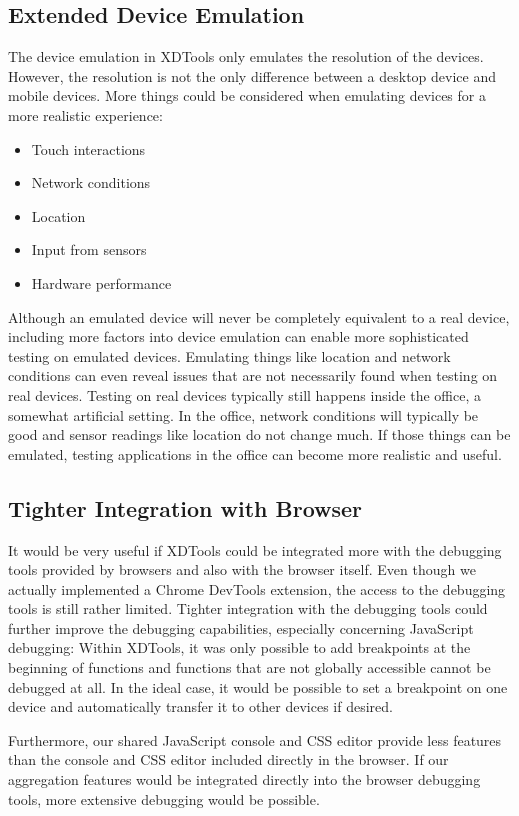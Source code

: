 \subsection{Extended Device Emulation}

The device emulation in XDTools only emulates the resolution of the devices. However, the resolution is not the only difference between a desktop device and mobile devices. More things could be considered when emulating devices for a more realistic experience:
\begin{itemize}
	\item Touch interactions
	\item Network conditions
	\item Location
	\item Input from sensors
	\item Hardware performance
\end{itemize}
Although an emulated device will never be completely equivalent to a real device, including more factors into device emulation can enable more sophisticated testing on emulated devices. Emulating things like location and network conditions can even reveal issues that are not necessarily found when testing on real devices. Testing on real devices typically still happens inside the office, a somewhat artificial setting. In the office, network conditions will typically be good and sensor readings like location do not change much. If those things can be emulated, testing applications in the office can become more realistic and useful.

\subsection{Tighter Integration with Browser}

It would be very useful if XDTools could be integrated more with the debugging tools provided by browsers and also with the browser itself. Even though we actually implemented a Chrome DevTools extension, the access to the debugging tools is still rather limited. Tighter integration with the debugging tools could further improve the debugging capabilities, especially concerning JavaScript debugging: Within XDTools, it was only possible to add breakpoints at the beginning of functions and functions that are not globally accessible cannot be debugged at all. In the ideal case, it would be possible to set a breakpoint on one device and automatically transfer it to other devices if desired. 

Furthermore, our shared JavaScript console and CSS editor provide less features than the console and CSS editor included directly in the browser. If our aggregation features would be integrated directly into the browser debugging tools, more extensive debugging would be possible.

